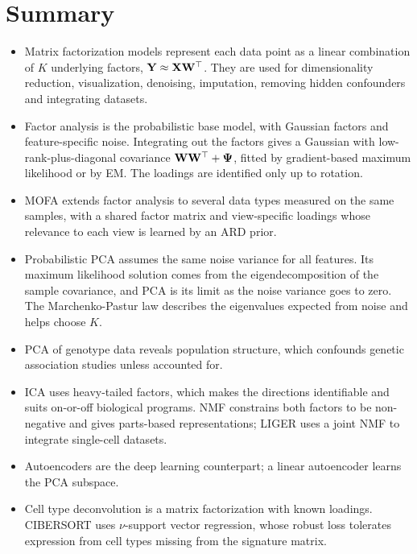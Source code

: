 \section{Summary}

\begin{itemize}
  \item Matrix factorization models represent each data point as a linear combination of $K$ underlying factors, $\mathbf{Y}\approx\mathbf{X}\mathbf{W}^\top$. They are used for dimensionality reduction, visualization, denoising, imputation, removing hidden confounders and integrating datasets.
  \item Factor analysis is the probabilistic base model, with Gaussian factors and feature-specific noise. Integrating out the factors gives a Gaussian with low-rank-plus-diagonal covariance $\mathbf{W}\mathbf{W}^\top+\boldsymbol{\Psi}$, fitted by gradient-based maximum likelihood or by EM. The loadings are identified only up to rotation.
  \item MOFA extends factor analysis to several data types measured on the same samples, with a shared factor matrix and view-specific loadings whose relevance to each view is learned by an ARD prior.
  \item Probabilistic PCA assumes the same noise variance for all features. Its maximum likelihood solution comes from the eigendecomposition of the sample covariance, and PCA is its limit as the noise variance goes to zero. The Marchenko-Pastur law describes the eigenvalues expected from noise and helps choose $K$.
  \item PCA of genotype data reveals population structure, which confounds genetic association studies unless accounted for.
  \item ICA uses heavy-tailed factors, which makes the directions identifiable and suits on-or-off biological programs. NMF constrains both factors to be non-negative and gives parts-based representations; LIGER uses a joint NMF to integrate single-cell datasets.
  \item Autoencoders are the deep learning counterpart; a linear autoencoder learns the PCA subspace.
  \item Cell type deconvolution is a matrix factorization with known loadings. CIBERSORT uses $\nu$-support vector regression, whose robust loss tolerates expression from cell types missing from the signature matrix.
\end{itemize}

